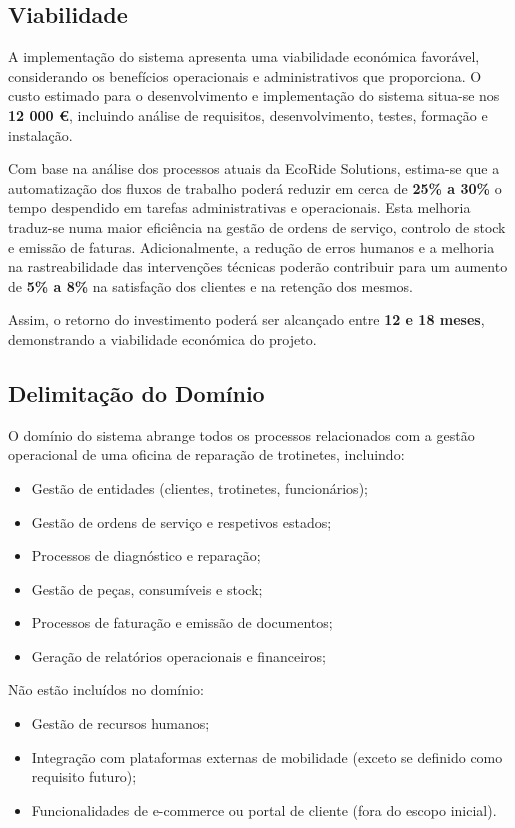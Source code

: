\documentclass[a4paper,12pt]{scrreprt}
\begin{document}
\subsection{Viabilidade}

A implementação do sistema apresenta uma viabilidade económica favorável, considerando os benefícios operacionais e administrativos que proporciona. O custo estimado para o desenvolvimento e implementação do sistema situa-se nos \textbf{12 000 €}, incluindo análise de requisitos, desenvolvimento, testes, formação e instalação.

Com base na análise dos processos atuais da EcoRide Solutions, estima-se que a automatização dos fluxos de trabalho poderá reduzir em cerca de \textbf{25\% a 30\%} o tempo despendido em tarefas administrativas e operacionais. Esta melhoria traduz-se numa maior eficiência na gestão de ordens de serviço, controlo de stock e emissão de faturas. Adicionalmente, a redução de erros humanos e a melhoria na rastreabilidade das intervenções técnicas poderão contribuir para um aumento de \textbf{5\% a 8\%} na satisfação dos clientes e na retenção dos mesmos.

Assim, o retorno do investimento poderá ser alcançado entre \textbf{12 e 18 meses}, demonstrando a viabilidade económica do projeto.

\subsection{Delimitação do Domínio}

O domínio do sistema abrange todos os processos relacionados com a gestão operacional de uma oficina de reparação de trotinetes, incluindo:
\begin{itemize}
	\item Gestão de entidades (clientes, trotinetes, funcionários);
	\item Gestão de ordens de serviço e respetivos estados;
	\item Processos de diagnóstico e reparação;
	\item Gestão de peças, consumíveis e stock;
	\item Processos de faturação e emissão de documentos;
	\item Geração de relatórios operacionais e financeiros;
\end{itemize}

Não estão incluídos no domínio:
\begin{itemize}
	\item Gestão de recursos humanos;
	\item Integração com plataformas externas de mobilidade (exceto se definido como requisito futuro);
	\item Funcionalidades de e-commerce ou portal de cliente (fora do escopo inicial).
\end{itemize}
\end{document}
